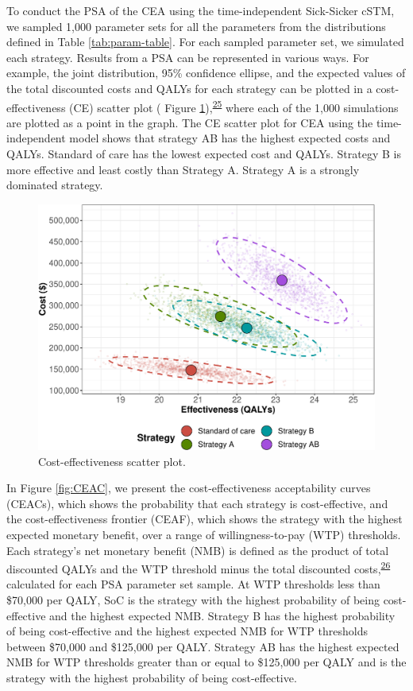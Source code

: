 \documentclass[
]{article}
\begin{document}
To conduct the PSA of the CEA using the time-independent Sick-Sicker cSTM, we sampled 1,000 parameter sets for all the parameters from the distributions defined in Table \ref{tab:param-table}. For each sampled parameter set, we simulated each strategy. Results from a PSA can be represented in various ways. For example, the joint distribution, 95\% confidence ellipse, and the expected values of the total discounted costs and QALYs for each strategy can be plotted in a cost-effectiveness (CE) scatter plot ( Figure \ref{fig:CE-scatter}),\textsuperscript{\protect\hyperlink{ref-Briggs2002}{25}} where each of the 1,000 simulations are plotted as a point in the graph. The CE scatter plot for CEA using the time-independent model shows that strategy AB has the highest expected costs and QALYs. Standard of care has the lowest expected cost and QALYs. Strategy B is more effective and least costly than Strategy A. Strategy A is a strongly dominated strategy.

\begin{figure}[H]

{\centering \includegraphics{figs/CE-scatter-1} 

}

\caption{Cost-effectiveness scatter plot.}\label{fig:CE-scatter}
\end{figure}

In Figure \ref{fig:CEAC}, we present the cost-effectiveness acceptability curves (CEACs), which shows the probability that each strategy is cost-effective, and the cost-effectiveness frontier (CEAF), which shows the strategy with the highest expected monetary benefit, over a range of willingness-to-pay (WTP) thresholds. Each strategy's net monetary benefit (NMB) is defined as the product of total discounted QALYs and the WTP threshold minus the total discounted costs,\textsuperscript{\protect\hyperlink{ref-Stinnett1998b}{26}} calculated for each PSA parameter set sample. At WTP thresholds less than \$70,000 per QALY, SoC is the strategy with the highest probability of being cost-effective and the highest expected NMB. Strategy B has the highest probability of being cost-effective and the highest expected NMB for WTP thresholds between \$70,000 and \$125,000 per QALY. Strategy AB has the highest expected NMB for WTP thresholds greater than or equal to \$125,000 per QALY and is the strategy with the highest probability of being cost-effective.
\end{document}
